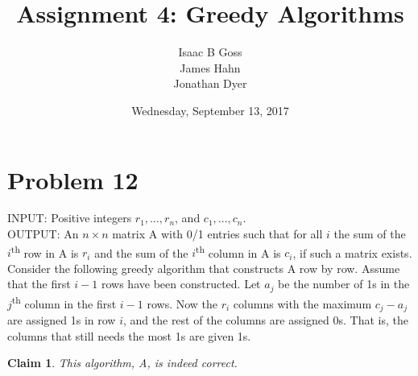 \documentclass{article}
\author{Isaac B Goss\\ James Hahn\\ Jonathan Dyer}
\title{Assignment 4: Greedy Algorithms}
\date{Wednesday, September 13, 2017}
\newtheorem{thm}{Claim}
\providecommand{\prob}[1]{\section*{Problem #1}}
\begin{document}
\maketitle

    \prob{12}
	INPUT: Positive integers $r_1, \dots, r_n $, and $c_1, \dots, c_n$. \\
	OUTPUT: An $n \times n$ matrix A with 0/1 entries such that for all $i$ the sum of the $i$\textsuperscript{th} row in A is $r_i$ and the sum of
	the $i$\textsuperscript{th} column in A is $c_i$, if such a matrix exists. Consider the following greedy algorithm that constructs A row
	by row. Assume that the first $i - 1$ rows have been constructed. Let $a_j$ be the number of 1\textsc{}s in the $j$\textsuperscript{th} column in
	the first $i - 1$ rows. Now the $r_i$ columns with the maximum $c_j - a_j$ are assigned 1\textsc{}s in row $i$, and the rest of the columns
	are assigned 0\textsc{}s. That is, the columns that still needs the most 1\textsc{}s are given 1\textsc{}s.
	
    \begin{thm}
        This algorithm, A, is indeed correct.
    \end{thm}
    
\end{document}
